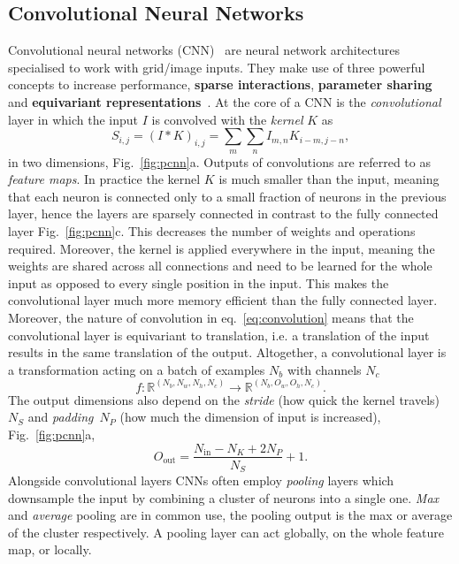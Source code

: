 \subsection{Convolutional Neural Networks} %
\label{subsec:nn-cnn} 
Convolutional neural networks (CNN)~\cite{lecun1989generalization} are neural network architectures specialised to work with grid/image inputs. They make use of three powerful concepts to increase performance, \textbf{sparse interactions}, \textbf{parameter sharing} and \textbf{equivariant representations}~\cite{goodfellow2016deep}. At the core of a CNN is the \emph{convolutional} layer in which the input $I$ is convolved with the \emph{kernel} $K$ as 
\begin{equation}
	\label{eq:convolution}
	S_{i,j} = (I * K)_{i,j} = \sum_m \sum_n I_{m,n} K_{i-m, j-n},
\end{equation}
in two dimensions, Fig.~\ref{fig:pcnn}a. Outputs of convolutions are referred to as \emph{feature maps}. In practice the kernel $K$ is much smaller than the input, meaning that each neuron is connected only to a small fraction of neurons in the previous layer, hence the layers are sparsely connected in contrast to the fully connected layer Fig.~\ref{fig:pcnn}c. This decreases the number of weights and operations required. Moreover, the kernel is applied everywhere in the input, meaning the weights are shared across all connections and need to be learned for the whole input as opposed to every single position in the input. This makes the convolutional layer much more memory efficient than the fully connected layer. Moreover, the nature of convolution in eq.~\eqref{eq:convolution} means that the convolutional layer is equivariant to translation, i.e. a translation of the input results in the same translation of the output. Altogether, a convolutional layer is a transformation acting on a batch of examples $N_b$ with channels $N_c$
\begin{equation}
	f: \mathbb{R}^{(N_b, N_w, N_h, N_c)} \rightarrow \mathbb{R}^{(N_b, O_w, O_h, N_c)}.
\end{equation}
The output dimensions also depend on the \emph{stride} (how quick the kernel travels)~$N_S$ and \emph{padding}~$N_P$ (how much the dimension of input is increased), Fig.~\ref{fig:pcnn}a,
\begin{equation}
	O_{\text{out}} = \frac{N_{\text{in}}-N_K+2N_P}{N_S}+1.
\end{equation}
Alongside convolutional layers CNNs often employ \emph{pooling} layers which downsample the input by combining a cluster of neurons into a single one. \emph{Max} and \emph{average} pooling are in common use, the pooling output is the max or average of the cluster respectively. A pooling layer can act globally, on the whole feature map, or locally. 


